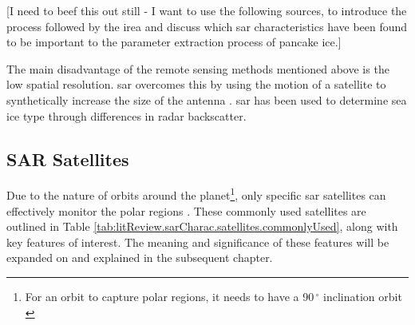 [I need to beef this out still - I want to use the following sources, \cite{Dierking2013,Zakhvatkina2019,Thomas2017Chap9} to introduce the process followed by the \acs{irea} and discuss which \acs{sar} characteristics have been found to be important to the parameter extraction process of pancake ice.]

The main disadvantage of the remote sensing methods mentioned above is the low spatial resolution. \acs{sar} overcomes this by using the motion of a satellite to synthetically increase the size of the antenna \cite{Thomas2017Chap9}. \acs{sar} has been used to determine sea ice type through differences in radar backscatter. 

\subsection{SAR Satellites}
\label{subsec:litReview.sarCharac.satellites}

Due to the nature of orbits around the planet\footnote{For an orbit to capture polar regions, it needs to have a 90\,$^{\circ}$ inclination orbit \cite{PolarOrbitNasa}}, only specific \acs{sar} satellites can effectively monitor the polar regions \cite{Thomas2017Chap9}. These commonly used satellites are outlined in Table \ref{tab:litReview.sarCharac.satellites.commonlyUsed}, along with key features of interest. The meaning and significance of these features will be expanded on and explained in the subsequent chapter.

